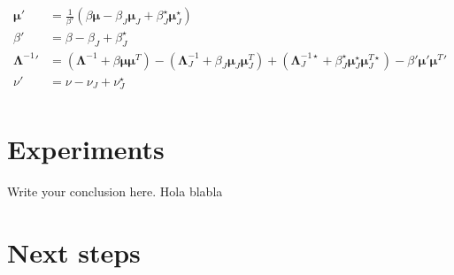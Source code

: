 \documentclass{article}
\begin{document}
\begin{align}
\boldsymbol{\mu}' &= \frac{1}{\beta '}(\beta\boldsymbol{\mu} 
        - \beta_J\boldsymbol{\mu}_J 
        + \beta_J^{\star}\boldsymbol{\mu}_J^{\star}) \\
\beta' &= \beta - \beta_J + \beta_J^{\star} \\
\boldsymbol{\Lambda}^{-1}' &= 
    (\boldsymbol{\Lambda}^{-1} + \beta\boldsymbol{\mu}\boldsymbol{\mu}^T)
    - (\boldsymbol{\Lambda}_J^{-1} 
        + \beta_J\boldsymbol{\mu}_J\boldsymbol{\mu}_J^T)
    + (\boldsymbol{\Lambda}_J^{-1\star} 
        + \beta_J^{\star}\boldsymbol{\mu}_J^{\star}\boldsymbol{\mu}_J^{T\star})
    - \beta'\boldsymbol{\mu}'\boldsymbol{\mu}^T' \\
\nu' &= \nu - \nu_J + \nu_J^{\star} \\
\end{align}

\section{Experiments}
Write your conclusion here.
Hola \cite{streaming-variational-bayes} blabla

\section{Next steps}


 
\end{document}

